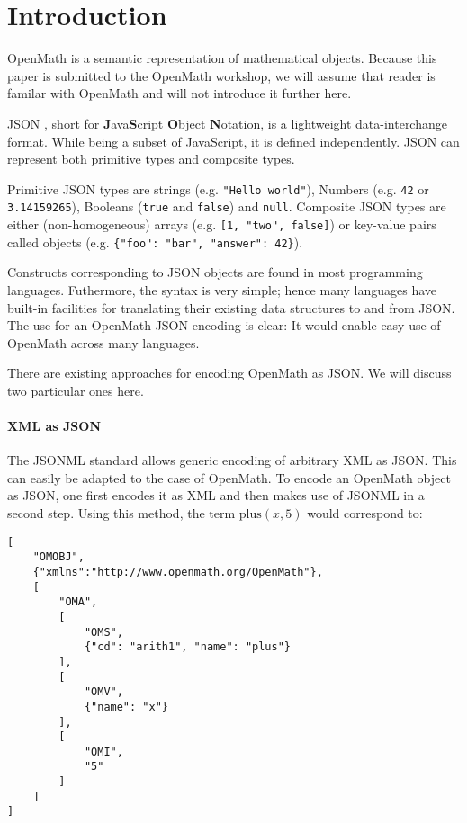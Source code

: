 \section{Introduction}

OpenMath is a semantic representation of mathematical objects. 
Because this paper is submitted to the OpenMath workshop, we will assume that reader is familar with OpenMath and will not introduce it further here. 

JSON , short for \textbf{J}ava\textbf{S}cript \textbf{O}bject \textbf{N}otation, is a lightweight data-interchange format. 
While being a subset of JavaScript, it is defined independently. 
JSON can represent both primitive types and composite types.

Primitive JSON types are strings (e.g. \lstinline{"Hello world"}), Numbers (e.g. \lstinline{42} or \lstinline{3.14159265}), Booleans (\lstinline{true} and \lstinline{false}) and \lstinline{null}. 
Composite JSON types are either (non-homogeneous) arrays (e.g. \lstinline{[1, "two", false]}) or key-value pairs called objects (e.g. \lstinline|{"foo": "bar", "answer": 42}|). 

Constructs corresponding to JSON objects are found in most programming languages. 
Futhermore, the syntax is very simple; hence many languages have built-in facilities for translating their existing data structures to and from JSON. 
The use for an OpenMath JSON encoding is clear: It would enable easy use of OpenMath across many languages. 

There are existing approaches for encoding OpenMath as JSON. 
We will discuss two particular ones here. 

\paragraph{XML as JSON}
The JSONML standard  allows generic encoding of arbitrary XML as JSON. 
This can easily be adapted to the case of OpenMath. 
To encode an OpenMath object as JSON, one first encodes it as XML and then makes use of JSONML in a second step. 
Using this method, the term $\mathrm{plus}(x, 5)$ would correspond to: 
\begin{lstlisting}
[
    "OMOBJ",
    {"xmlns":"http://www.openmath.org/OpenMath"},
    [
        "OMA",
        [
            "OMS", 
            {"cd": "arith1", "name": "plus"}
        ],
        [
            "OMV", 
            {"name": "x"}
        ],
        [
            "OMI", 
            "5"
        ]
    ]
]
\end{lstlisting}

